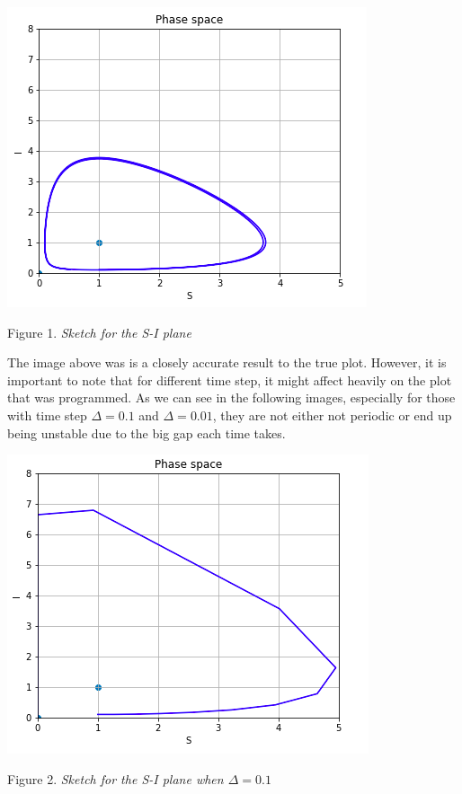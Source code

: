 \documentclass[../main.tex]{subfiles}
\begin{document}
    \begin{center}
        \includegraphics[scale=.5]{images/SI_plane.png}
        
        Figure 1. \textit{Sketch for the S-I plane}
    \end{center}
    
    \begin{flushleft}
        
        The image above was is a closely accurate result to the true plot. However, it is important to note that for different time step, it might affect heavily on the plot that was programmed. As we can see in the following images, especially for those with time step $\Delta = 0.1$ and $\Delta = 0.01$, they are not either not periodic or end up being unstable due to the big gap each time takes.
    \end{flushleft}
    
    \begin{center}
        \includegraphics[scale=.5]{images/false_image_1.png}
        
        Figure 2. \textit{Sketch for the S-I plane when $\Delta = 0.1$}
    \end{center}
    
\end{document}
